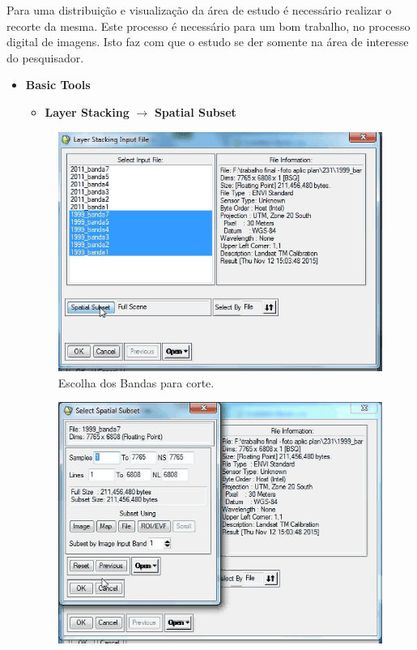 \hspace{1.5cm}
Para uma distribuição e visualização da área de estudo é necessário realizar o recorte da mesma. Este processo é necessário para um bom trabalho, no processo digital de imagens. Isto faz com que o estudo se der somente na área de interesse do pesquisador. 

\begin{itemize}
\item \textbf{Basic Tools}
\begin{itemize}
\item \textbf{Layer Stacking} $\rightarrow$ \textbf{Spatial Subset}\\

\end{itemize}
\begin{figure}[!htpb]
        \centering
        \includegraphics[scale =0.4]{imagens/corte04.png}
        \caption{Escolha dos Bandas para corte.}
        \label{corte04}
\end{figure}
\begin{figure}[!htpb]
        \centering
        \includegraphics[scale=0.4]{imagens/corte05.png}

\end{figure}
\end{itemize}
